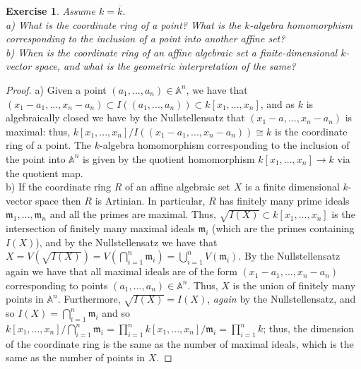 \documentclass{article}
\newcommand{\bb}[1]{\mathbb{#1}}
\newcommand{\fk}[1]{\mathfrak{#1}}
\newcommand{\iso}{\cong}
\newtheorem{exercise}{Exercise}
\begin{document}
\begin{exercise}
  Assume $k = \overline{k}$. \\
  a) What is the coordinate ring of a point? What is the $k$-algebra homomorphism corresponding to the inclusion of a point into another affine set? \\
  b) When is the coordinate ring of an affine algebraic set a finite-dimensional $k$-vector space, and what is the geometric interpretation of the same?
\end{exercise}
\begin{proof}
  a) Given a point $(a_{1},...,a_{n}) \in \bb{A}^{n}$, we have that $(x_{1}-a_{1},...,x_{n}-a_{n}) \subset I((a_{1},...,a_{n})) \subset k[x_{1},...,x_{n}]$, and as $k$ is algebraically closed we have by the Nullstellensatz that $(x_{1}-a,...,x_{n}-a_{n})$ is maximal: thus, $k[x_{1},...,x_{n}]/I((x_{1}-a_{1},...,x_{n}-a_{n})) \iso k$ is the coordinate ring of a point. The $k$-algebra homomorphism corresponding to the inclusion of the point into $\bb{A}^{n}$ is given by the quotient homomorphism $k[x_{1},...,x_{n}] \to k$ via the quotient map. \\

  b) If the coordinate ring $R$ of an affine algebraic set $X$ is a finite dimensional $k$-vector space then $R$ is Artinian. In particular, $R$ has finitely many prime ideals $\fk{m}_{1},...,\fk{m}_{n}$ and all the primes are maximal. Thus, $\sqrt{I(X)} \subset k[x_{1},...,x_{n}]$ is the intersection of finitely many maximal ideals $\fk{m}_{i}$ (which are the primes containing $I(X)$), and by the Nullstellensatz we have that $X = V(\sqrt{I(X)}) = V(\bigcap_{i=1}^{n} \fk{m}_{i}) = \bigcup_{i=1}^{n}V(\fk{m}_{i})$. By the Nullstellensatz again we have that all maximal ideals are of the form $(x_{1}-a_{1},...,x_{n}-a_{n})$ corresponding to points $(a_{1},...,a_{n}) \in \bb{A}^{n}$. Thus, $X$ is the union of finitely many points in $\bb{A}^{n}$. Furthermore, $\sqrt{I(X)} = I(X)$, \emph{again} by the Nullstellensatz, and so $I(X) = \bigcap_{i=1}^{n}\fk{m}_{i}$ and so $k[x_{1},...,x_{n}]/\bigcap_{i=1}^{n}\fk{m}_{i} = \prod_{i=1}^{n}k[x_{1},...,x_{n}]/\fk{m}_{i} = \prod_{i=1}^{n}k$; thus, the dimension of the coordinate ring is the same as the number of maximal ideals, which is the same as the number of points in $X$. 
\end{proof}
\end{document}
